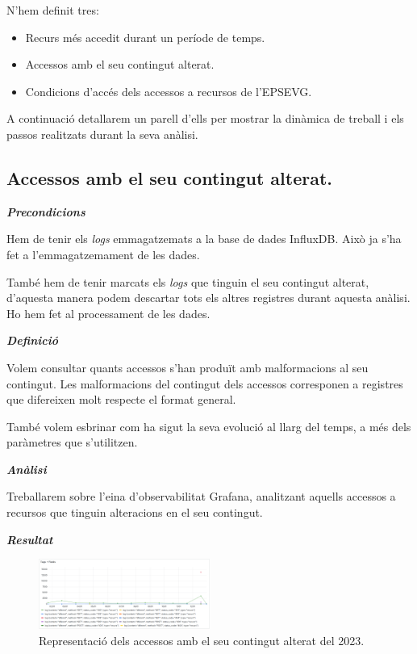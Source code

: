 \documentclass[lettersize,journal]{IEEEtran}
\begin{document}
N'hem definit tres:
\begin{itemize}
    \item Recurs més accedit durant un període de temps.
    \item Accessos amb el seu contingut alterat.
    \item Condicions d'accés dels accessos a recursos de l'EPSEVG.
\end{itemize}

A continuació detallarem un parell d'ells per mostrar la dinàmica de treball i els passos realitzats durant la seva anàlisi.

\subsection{Accessos amb el seu contingut alterat.}\label{subsec:use-case-2}

\textit{\textbf{Precondicions}}

Hem de tenir els \textit{logs} emmagatzemats a la base de dades InfluxDB.
Això ja s'ha fet a l'emmagatzemament de les dades.

També hem de tenir marcats els \textit{logs} que tinguin el seu contingut alterat, d'aquesta manera podem descartar tots els altres registres durant aquesta anàlisi.
Ho hem fet al processament de les dades.

\textit{\textbf{Definició}}

Volem consultar quants accessos s'han produït amb malformacions al seu contingut.
Les malformacions del contingut dels accessos corresponen a registres que difereixen molt respecte el format general.

També volem esbrinar com ha sigut la seva evolució al llarg del temps, a més dels paràmetres que s'utilitzen.

\textit{\textbf{Anàlisi}}

Treballarem sobre l'eina d'observabilitat Grafana, analitzant aquells accessos a recursos que tinguin alteracions en el seu contingut.

\textit{\textbf{Resultat}}

\begin{figure}[!t]
    \centerline{\includegraphics[width=0.5\textwidth]{figures/possible-attacks}}
    \caption{Representació dels accessos amb el seu contingut alterat del 2023.}\label{fig:log-altered}
\end{figure}
\end{document}
